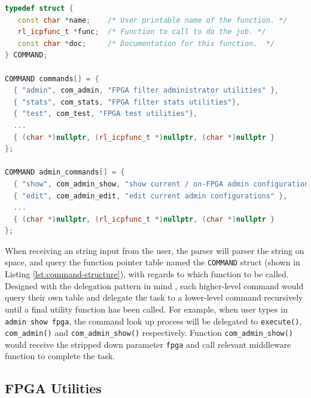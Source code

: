 \documentclass[a4paper]{report}
\newcommand{\code}{\texttt}
\begin{document}
\begin{lstlisting}[language=C++, caption=\code{COMMAND} structure,  label={lst:command-structure}]
typedef struct {
   const char *name;    /* User printable name of the function. */
   rl_icpfunc_t *func;  /* Function to call to do the job. */
   const char *doc;     /* Documentation for this function.  */
} COMMAND;

COMMAND commands[] = {
  { "admin", com_admin, "FPGA filter administrator utilities" },
  { "stats", com_stats, "FPGA filter stats utilities"},
  { "test", com_test, "FPGA test utilities"},
  ...
  { (char *)nullptr, (rl_icpfunc_t *)nullptr, (char *)nullptr }
};

COMMAND admin_commands[] = {
  { "show", com_admin_show, "show current / on-FPGA admin configurations [fpga/curr]" },
  { "edit", com_admin_edit, "edit current admin configurations" },
  ...
  { (char *)nullptr, (rl_icpfunc_t *)nullptr, (char *)nullptr }
};
\end{lstlisting}

When receiving an string input from the user, the parser will parser the string on space, and query the function pointer table named the \code{COMMAND} struct (shown in Listing \ref{lst:command-structure}), with regards to which function to be called. Designed with the delegation pattern in mind \cite{gamma-1995}, each higher-level command would query their own table and delegate the task to a lower-level command recursively  until a final utility function has been called. For example, when user types in \code{admin show fpga}, the command look up process will be delegated to \code{execute()}, \code{com\_admin()} and \code{com\_admin\_show()} respectively. Function \code{com\_admin\_show()} would receive the stripped down parameter \code{fpga} and call relevant middleware function to complete the task. 

\subsection{FPGA Utilities}
\end{document}
